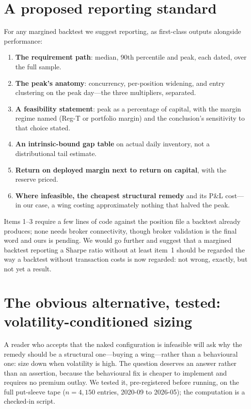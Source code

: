 \documentclass[11pt]{article}
\begin{document}
\section{A proposed reporting standard}\label{sec:standard}
For any margined backtest we suggest reporting, as first-class outputs alongside performance:
\begin{enumerate}\itemsep0.05em
\item \textbf{The requirement path}: median, 90th percentile and peak, each dated, over the full
sample.
\item \textbf{The peak's anatomy}: concurrency, per-position widening, and entry clustering on
the peak day---the three multipliers, separated.
\item \textbf{A feasibility statement}: peak as a percentage of capital, with the margin regime
named (Reg-T or portfolio margin) and the conclusion's sensitivity to that choice stated.
\item \textbf{An intrinsic-bound gap table} on actual daily inventory, not a distributional
tail estimate.
\item \textbf{Return on deployed margin next to return on capital}, with the reserve priced.
\item \textbf{Where infeasible, the cheapest structural remedy} and its P\&L cost---in our case,
a wing costing approximately nothing that halved the peak.
\end{enumerate}
Items 1--3 require a few lines of code against the position file a backtest already produces;
none needs broker connectivity, though broker validation is the final word and ours is pending.
We would go further and suggest that a margined backtest reporting a Sharpe ratio without at
least item~1 should be regarded the way a backtest without transaction costs is now regarded:
not wrong, exactly, but not yet a result.

\section{The obvious alternative, tested: volatility-conditioned sizing}\label{sec:vix}
A reader who accepts that the naked configuration is infeasible will ask why the remedy should
be a structural one---buying a wing---rather than a behavioural one: size down when volatility
is high. The question deserves an answer rather than an assertion, because the behavioural fix
is cheaper to implement and requires no premium outlay. We tested it, pre-registered before
running, on the full put-sleeve tape ($n = 4{,}150$ entries, 2020-09 to 2026-05); the
computation is a checked-in script.
\end{document}
